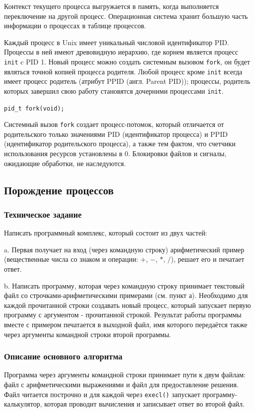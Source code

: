 \documentclass[a4paper,14pt]{extarticle}
\begin{document}
Контекст текущего процесса выгружается в память, когда выполняется переключение на другой процесс. Операционная система хранит большую часть информации о процессах в таблице процессов.

Каждый процесс в Unix имеет уникальный числовой идентификатор PID. Процессы в ней имеют древовидную иерархию, где корнем является процесс \verb|init| c PID 1. Новый процесс можно создать системным вызовом \verb|fork|, он будет являться точной копией процесса родителя. Любой процесс кроме \verb|init| всегда имеет процесс родитель (атрибут PPID (англ. Parent PID)); процессы, родитель которых завершил свою работу становятся дочерними процессами \verb|init|.

\verb|pid_t fork(void);|

Системный вызов \verb|fork| создает процесс-потомок, который отличается от родительского только значениями PID (идентификатор процесса) и PPID (идентификатор родительского процесса), а также тем фактом, что счетчики использования ресурсов установлены в 0. Блокировки файлов и сигналы, ожидающие обработки, не наследуются.
\subsection{Порождение процессов}
\subsubsection{Техническое задание}
Написать программный комплекс, который состоит из двух частей:

a.	Первая получает на вход (через командную строку) арифметический пример (вещественные числа со знаком и операции: $+$, $-$, $*$, $/$), решает его и печатает ответ.

b.	Написать программу, которая через командную строку принимает текстовый файл со строчками-арифметическими примерами (см. пункт а). Необходимо для каждой прочитанной строки создавать новый процесс, который запускает первую программу с аргументом - прочитанной строкой. Результат работы программы вместе с примером печатается в выходной файл, имя которого передаётся также через аргументы командной строки второй программы.

\subsubsection{Описание основного алгоритма}
Программа через аргументы командной строки принимает пути к двум файлам: файл с арифметическими выражениями и файл для предоставление решения. Файл читается построчно и для каждой через \verb|execl()| запускает программу-калькулятор, которая проводит вычисления и записывает ответ во второй файл.
\end{document}
